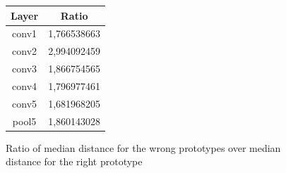 \begin{figure}[htb]
\centering
\begin{tabular}{|c|c|}
  \hline
   Layer & Ratio \\
  \hline
  conv1 & 1,766538663 \\
  conv2 & 2,994092459 \\
  conv3 & 1,866754565 \\
  conv4 & 1,796977461 \\
  conv5 & 1,681968205 \\
  pool5 & 1,860143028 \\
  \hline
\end{tabular}
\caption{Ratio of median distance for the wrong prototypes over median distance for the right prototype}
\label{fulltrainvalues}
\end{figure}

